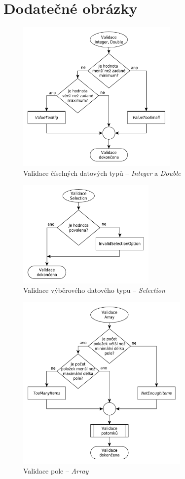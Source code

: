 \documentclass[FM,bw,DP]{tulthesis}
\begin{document}
\chapter{Dodatečné obrázky}

\begin{figure}[h]
	\centering
    \includegraphics[width=0.7\textwidth]{../img/validation_number.pdf}
    \caption{Validace číselných datových typů -- \textit{Integer} a \textit{Double}}
	\label{img:validation_number}
\end{figure}

\begin{figure}[h]
	\centering
    \includegraphics[width=0.6\textwidth]{../img/validation_selection.pdf}
    \caption{Validace výběrového datového typu -- \textit{Selection}}
	\label{img:validation_selection}
\end{figure}

\begin{figure}[h]
	\centering
    \includegraphics[width=0.75\textwidth]{../img/validation_array.pdf}
    \caption{Validace pole -- \textit{Array}}
	\label{img:validation_array}
\end{figure}
\end{document}

